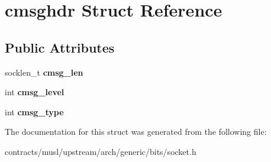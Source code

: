 \hypertarget{structcmsghdr}{}\section{cmsghdr Struct Reference}
\label{structcmsghdr}
\subsection*{Public Attributes}
\begin{DoxyCompactItemize}
\item 
\mbox{\label{structcmsghdr_a7cf479e5e162e65ad164616453d61df2}} 
socklen\+\_\+t {\bfseries cmsg\+\_\+len}
\item 
\mbox{\label{structcmsghdr_ac0ff1400cb63fbc2e0ece19434cb8fef}} 
int {\bfseries cmsg\+\_\+level}
\item 
\mbox{\label{structcmsghdr_a4c7cabf7899a688ce10bc92773fca9c1}} 
int {\bfseries cmsg\+\_\+type}
\end{DoxyCompactItemize}


The documentation for this struct was generated from the following file\+:\begin{DoxyCompactItemize}
\item 
contracts/musl/upstream/arch/generic/bits/socket.\+h\end{DoxyCompactItemize}
